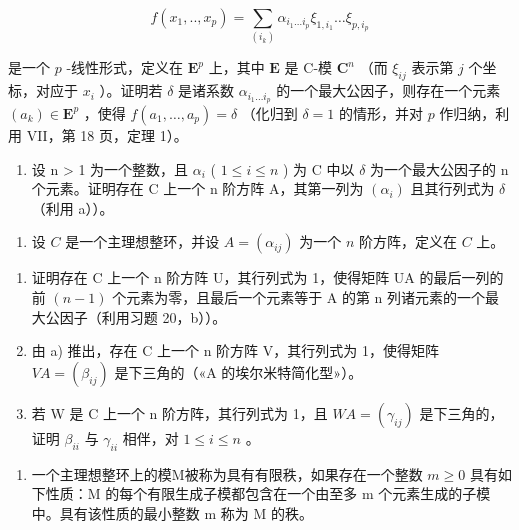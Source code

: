 \[
f (x _ {1},.., x _ {p}) = \sum_ {(i _ {k})} \alpha_ {i _ {1} \dots i _ {p}} \xi_ {1, i _ {1}} \dots \xi_ {p, i _ {p}}
\]

是一个 \(p\) -线性形式，定义在 \(\mathbf{E}^p\) 上，其中 \(\mathbf{E}\) 是 C-模 \(\mathbf{C}^n\) （而 \(\xi_{ij}\) 表示第 \(j\) 个坐标，对应于 \(x_i\) ）。证明若 \(\delta\) 是诸系数 \(\alpha_{i_1\dots i_p}\) 的一个最大公因子，则存在一个元素 \((a_k)\in \mathbf{E}^p\) ，使得 \(f(a_1,\dots,a_p) = \delta\) （化归到 \(\delta = 1\) 的情形，并对 \(p\) 作归纳，利用 VII，第 18 页，定理 1）。

\begin{enumerate}
\def\labelenumi{\alph{enumi})}
\setcounter{enumi}{1}
\tightlist
\item
  设 n \textgreater{} 1 为一个整数，且 \(\alpha_{i}\) ( \(1 \leqslant i \leqslant n\) ) 为 C 中以 \(\delta\) 为一个最大公因子的 n 个元素。证明存在 C 上一个 n 阶方阵 A，其第一列为 \((\alpha_{i})\) 且其行列式为 \(\delta\) （利用 a））。
\end{enumerate}

\begin{enumerate}
\def\labelenumi{\arabic{enumi})}
\setcounter{enumi}{20}
\tightlist
\item
  设 \(C\) 是一个主理想整环，并设 \(A = (\alpha_{ij})\) 为一个 \(n\) 阶方阵，定义在 \(C\) 上。
\end{enumerate}

\begin{enumerate}
\def\labelenumi{\alph{enumi})}
\item
  证明存在 C 上一个 n 阶方阵 U，其行列式为 1，使得矩阵 UA 的最后一列的前 \((n-1)\) 个元素为零，且最后一个元素等于 A 的第 n 列诸元素的一个最大公因子（利用习题 20，b））。
\item
  由 a) 推出，存在 C 上一个 n 阶方阵 V，其行列式为 1，使得矩阵 \(VA = (\beta_{ij})\) 是下三角的（«A 的埃尔米特简化型»）。
\item
  若 W 是 C 上一个 n 阶方阵，其行列式为 1，且 \(WA = (\gamma_{ij})\) 是下三角的，证明 \(\beta_{ii}\) 与 \(\gamma_{ii}\) 相伴，对 \(1 \leqslant i \leqslant n\) 。
\end{enumerate}

\begin{enumerate}
\def\labelenumi{\arabic{enumi})}
\setcounter{enumi}{21}
\tightlist
\item
  一个主理想整环上的模M被称为具有有限秩，如果存在一个整数 \(m \geqslant 0\) 具有如下性质：M 的每个有限生成子模都包含在一个由至多 m 个元素生成的子模中。具有该性质的最小整数 m 称为 M 的秩。
\end{enumerate}

